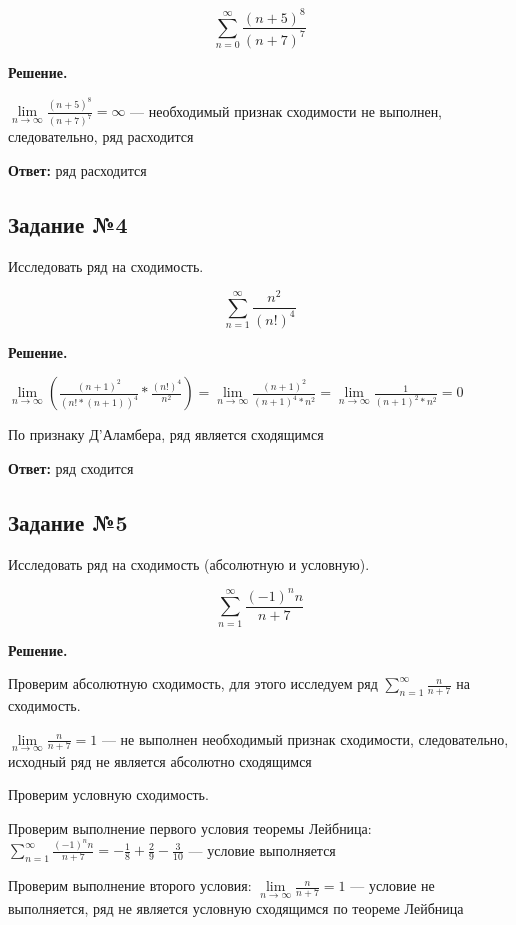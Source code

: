 \documentclass{article}
\begin{document}
$$
\sum\limits_{n = 0}^{\infty} \frac{(n + 5)^8}{(n + 7)^7}
$$

\textbf{Решение.}

$\lim\limits_{n \to \infty} \frac{(n + 5)^8}{(n + 7)^7} = \infty$ — необходимый признак сходимости не выполнен, следовательно, ряд расходится

\hfill

\textbf{Ответ:} ряд расходится

\subsection{Задание №4}

Исследовать ряд на сходимость.

$$
\sum\limits_{n = 1}^{\infty} \frac{n^2}{(n!)^4}
$$

\textbf{Решение.}

$\lim\limits_{n \to \infty} (\frac{(n + 1)^2}{(n! * (n + 1))^4} * \frac{(n!)^4}{n^2}) = \lim\limits_{n \to \infty} \frac{(n + 1)^2}{(n + 1)^4 * n^2} = \lim\limits_{n \to \infty} \frac{1}{(n + 1)^2 * n^2} = 0$

По признаку Д'Аламбера, ряд является сходящимся

\hfill

\textbf{Ответ: } ряд сходится

\subsection{Задание №5}

Исследовать ряд на сходимость (абсолютную и условную).

$$
\sum\limits_{n = 1}^{\infty} \frac{(-1)^{n} n}{n + 7}
$$

\textbf{Решение.}

Проверим абсолютную сходимость, для этого исследуем ряд $\sum\limits_{n = 1}^{\infty} \frac{n}{n + 7}$ на сходимость.

$\lim\limits_{n \to \infty} \frac{n}{n + 7} = 1$ — не выполнен необходимый признак сходимости, следовательно, исходный ряд не является абсолютно сходящимся

\hfill

Проверим условную сходимость.

Проверим выполнение первого условия теоремы Лейбница:
$\sum\limits_{n = 1}^{\infty} \frac{(-1)^{n} n}{n + 7} = -\frac{1}{8} + \frac{2}{9} - \frac{3}{10}$ — условие выполняется

Проверим выполнение второго условия: $\lim\limits_{n \to \infty} \frac{n}{n + 7} = 1$ — условие не выполняется, ряд не является условную сходящимся по теореме Лейбница
\end{document}
